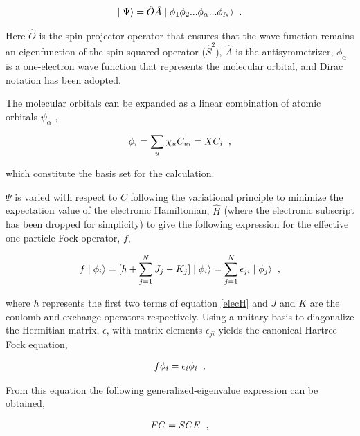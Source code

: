 \begin{gather}
\mid \Psi \rangle = \hat{O}\hat{A}\mid \phi_1\phi_2 ...\phi_{\alpha}... \phi_N\rangle\hspace{0.2cm}.
\end{gather}

Here $\hat{O}$ is the spin projector operator that ensures that the wave function remains an eigenfunction of the spin-squared operator ($\hat{S}^2$), $\hat{A}$ is the antisymmetrizer, $\phi_{\alpha}$ is a one-electron wave function that represents the molecular orbital, and Dirac notation has been adopted.

The molecular orbitals can be expanded as a linear combination of atomic orbitals $\psi_{\alpha}$ ,

\begin{gather}
\phi_i=\sum_u\chi_uC_{ui}=XC_i\hspace{0.2cm},
\end{gather}

\noindent which constitute the basis set for the calculation.

$\Psi$ is varied with respect to $C$ following the variational principle to minimize the expectation value of the electronic Hamiltonian, $\hat{H}$ (where the electronic subscript has been dropped for simplicity) to give the following expression for the effective one-particle Fock operator, $f$,

\begin{gather}
f\mid\phi_i\rangle=[h+\sum_{j=1}^{N}J_{j}-K_{j}]\mid\phi_i\rangle=\sum_{j=1}^{N}\epsilon_{ji}\mid\phi_j\rangle\hspace{0.2cm},
\end{gather}

\noindent where $h$ represents the first two terms of equation \eqref{elecH} and $J$ and $K$ are the coulomb and exchange operators respectively. Using a unitary basis to diagonalize the Hermitian matrix, $\epsilon$, with matrix elements $\epsilon_{ji}$ yields the canonical Hartree-Fock equation,

\begin{gather}
f\phi_i=\epsilon_i\phi_i\hspace{0.2cm}.
\end{gather}

From this equation the following generalized-eigenvalue expression can be obtained,

\begin{gather}
FC=SCE\hspace{0.2cm},
\end{gather}

